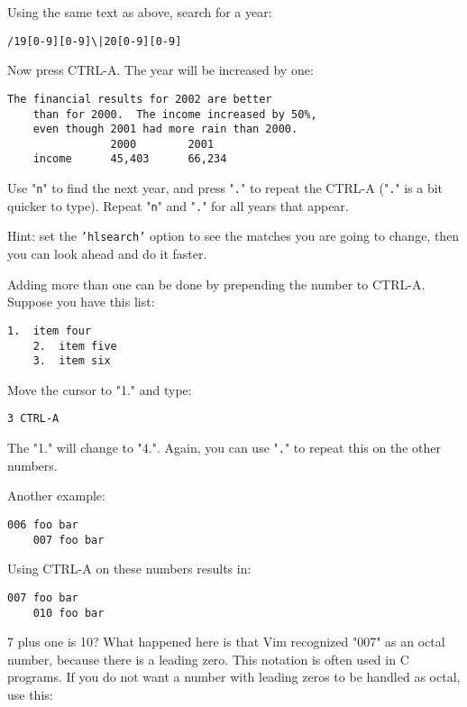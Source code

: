Using the same text as above, search for a year:

\begin{Verbatim}[samepage=true]
 /19[0-9][0-9]\|20[0-9][0-9]
\end{Verbatim}

Now press CTRL-A.
The year will be increased by one:

\begin{Verbatim}[samepage=true]
    The financial results for 2002 are better 
    than for 2000.  The income increased by 50%, 
    even though 2001 had more rain than 2000. 
                2000        2001 
    income      45,403      66,234 
\end{Verbatim}

Use "\texttt{n}" to find the next year, and press "\texttt{.}" to repeat the CTRL-A ("\texttt{.}" is a bit quicker to type).
Repeat "\texttt{n}" and "\texttt{.}" for all years that appear.

Hint: set the \texttt{'hlsearch'} option to see the matches you are going to change, then you can look ahead and do it faster.

Adding more than one can be done by prepending the number to CTRL-A.
Suppose you have this list:

\begin{Verbatim}[samepage=true]
    1.  item four 
    2.  item five 
    3.  item six 
\end{Verbatim}

Move the cursor to "1." and type:

\begin{Verbatim}[samepage=true]
 3 CTRL-A
\end{Verbatim}

The "1." will change to "4.".
Again, you can use "\texttt{.}" to repeat this on the other numbers.

Another example:

\begin{Verbatim}[samepage=true]
    006 foo bar 
    007 foo bar 
\end{Verbatim}

Using CTRL-A on these numbers results in:

\begin{Verbatim}[samepage=true]
    007 foo bar 
    010 foo bar 
\end{Verbatim}

7 plus one is 10?  What happened here is that Vim recognized "007" as an octal number, because there is a leading zero.
This notation is often used in C programs.
If you do not want a number with leading zeros to be handled as octal, use this:


